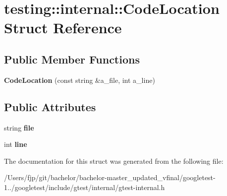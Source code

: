 \hypertarget{structtesting_1_1internal_1_1_code_location}{}\section{testing\+:\+:internal\+:\+:Code\+Location Struct Reference}
\label{structtesting_1_1internal_1_1_code_location}
\subsection*{Public Member Functions}
\begin{DoxyCompactItemize}
\item 
\mbox{\label{structtesting_1_1internal_1_1_code_location_ade3ecb2a54905619cd40a6856b48cd5a}} 
{\bfseries Code\+Location} (const string \&a\+\_\+file, int a\+\_\+line)
\end{DoxyCompactItemize}
\subsection*{Public Attributes}
\begin{DoxyCompactItemize}
\item 
\mbox{\label{structtesting_1_1internal_1_1_code_location_ab8a24d5e63295e411d37578dbb9427c0}} 
string {\bfseries file}
\item 
\mbox{\label{structtesting_1_1internal_1_1_code_location_a01c977c7e8834a05a6d6c40b0c416045}} 
int {\bfseries line}
\end{DoxyCompactItemize}


The documentation for this struct was generated from the following file\+:\begin{DoxyCompactItemize}
\item 
/\+Users/fjp/git/bachelor/bachelor-\/master\+\_\+updated\+\_\+vfinal/googletest-\/1../googletest/include/gtest/internal/gtest-\/internal.\+h\end{DoxyCompactItemize}
